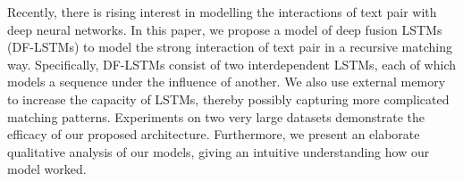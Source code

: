 Recently, there is rising interest in modelling the interactions of text pair with deep neural networks.  In this paper, we propose a model of deep fusion LSTMs (DF-LSTMs) to model the strong interaction of text pair in a recursive matching way. Specifically, DF-LSTMs consist of two interdependent LSTMs, each of which models a sequence under the influence of another. We also use external memory to increase the capacity of LSTMs, thereby possibly capturing more complicated matching patterns. Experiments on two very large datasets demonstrate the efficacy of our proposed architecture. Furthermore, we present an elaborate qualitative analysis of our models, giving an intuitive understanding how our model worked.

